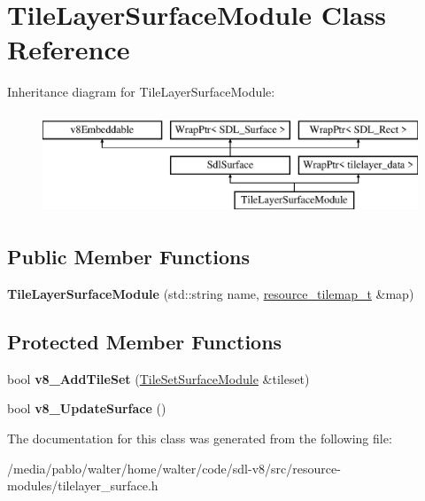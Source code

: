 \hypertarget{classTileLayerSurfaceModule}{}\section{Tile\+Layer\+Surface\+Module Class Reference}
\label{classTileLayerSurfaceModule}
Inheritance diagram for Tile\+Layer\+Surface\+Module\+:\begin{figure}[H]
\begin{center}
\leavevmode
\includegraphics[height=3.000000cm]{classTileLayerSurfaceModule}
\end{center}
\end{figure}
\subsection*{Public Member Functions}
\begin{DoxyCompactItemize}
\item 
\mbox{\label{classTileLayerSurfaceModule_aa02c4e4e1b1db799f0967fc3d3edd10a}} 
{\bfseries Tile\+Layer\+Surface\+Module} (std\+::string name, \mbox{\hyperlink{classWrapPtr}{resource\+\_\+tilemap\+\_\+t}} \&map)
\end{DoxyCompactItemize}
\subsection*{Protected Member Functions}
\begin{DoxyCompactItemize}
\item 
\mbox{\label{classTileLayerSurfaceModule_acea729f3d7f9bc1489f470c5ab7c0d3d}} 
bool {\bfseries v8\+\_\+\+Add\+Tile\+Set} (\mbox{\hyperlink{classTileSetSurfaceModule}{Tile\+Set\+Surface\+Module}} \&tileset)
\item 
\mbox{\label{classTileLayerSurfaceModule_a093d87da25aab824af6be3c5a05992c0}} 
bool {\bfseries v8\+\_\+\+Update\+Surface} ()
\end{DoxyCompactItemize}


The documentation for this class was generated from the following file\+:\begin{DoxyCompactItemize}
\item 
/media/pablo/walter/home/walter/code/sdl-\/v8/src/resource-\/modules/tilelayer\+\_\+surface.\+h\end{DoxyCompactItemize}

